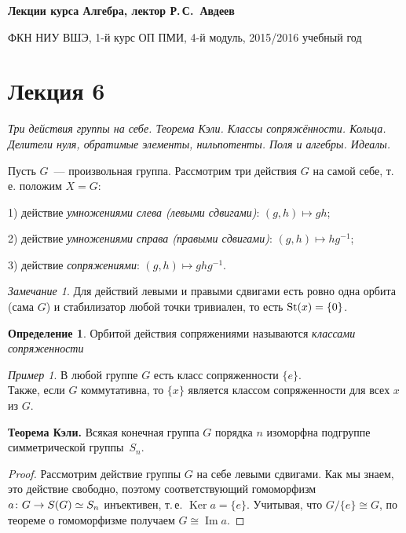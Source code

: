 \documentclass[a4paper,10pt]{amsart}
\newcommand{\Ker}{\mathop{\mathrm{Ker}}}
\renewcommand{\Im}{\mathop{\mathrm{Im}}}
\def\St{{\rm St}}%
\theoremstyle{definition}
\newtheorem{definition}{Определение}
\theoremstyle{remark}
\newtheorem{remark}{Замечание}
\newtheorem{example}{Пример}
\begin{document}
%
\sloppy
%
\centerline{\large \bf Лекции курса \guillemotleft
Алгебра\guillemotright{}, лектор Р.\,С.~Авдеев}

\smallskip

\centerline{\large ФКН НИУ ВШЭ, 1-й курс ОП ПМИ, 4-й модуль,
2015/2016 учебный год}


\bigskip

\section*{Лекция 6}

\medskip

{\it Три действия группы на себе. Теорема Кэли. Классы сопряжённости.
Кольца. Делители нуля, обратимые элементы, нильпотенты. Поля и алгебры.
Идеалы. }

\medskip

Пусть $G$~--- произвольная группа. Рассмотрим три действия $G$ на
самой себе, т.\,е. положим $X=G$:

1) действие {\it умножениями слева (левыми сдвигами)}: $(g,h)\mapsto gh$;

2) действие {\it умножениями справа (правыми сдвигами)}: $(g,h)\mapsto hg^{-1}$;

3) действие {\it сопряжениями}: $(g,h)\mapsto ghg^{-1}$.

\begin{remark}
Для действий левыми и правыми сдвигами есть ровно одна орбита (сама $G$) и
стабилизатор любой точки тривиален, то есть $\St(x) = \{0\}$.
\end{remark}

\begin{definition}
Орбитой действия сопряжениями называются \textit{классами сопряженности}
\end{definition}

\begin{example}
В любой группе $G$ есть класс сопряженности $\{e\}$. \\Также, если $G$ коммутативна, то $\{x\}$ является классом сопряженности для всех $x$ из $G$.
\end{example}

\smallskip

{\bf Теорема Кэли.} Всякая конечная группа $G$ порядка $n$ изоморфна
подгруппе симметрической группы~$S_n$.

\begin{proof}
Рассмотрим действие группы $G$ на себе левыми сдвигами. Как мы
знаем, это действие свободно, поэтому соответствующий гомоморфизм $a
\colon G \to S(G) \simeq\nobreak S_n$ инъективен, т.\,е. $\Ker a =
\lbrace e \rbrace$. Учитывая, что $G / \lbrace e \rbrace \cong G$,
по теореме о гомоморфизме получаем $G \cong \Im a$.
\end{proof}
\end{document}
